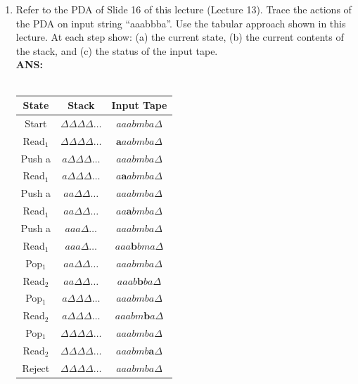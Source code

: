 \documentclass[letterpaper, 12 pt]{article}
\begin{document}
\begin{enumerate}
    \item[18.]Refer to the PDA of Slide 16 of this lecture (Lecture 13). Trace
        the actions of the PDA on input string “aaabbba”. Use the tabular
        approach shown in this lecture. At each step show: (a) the current
        state, (b) the current contents of the stack, and (c) the status of the
        input tape. \\
        \textbf{ANS:} \\ \hfill \\
        \begin{center}
            \begin{tabular}{| c | c | c |}
                \hline
                State & Stack & Input Tape \\ 
                \hline
                Start    & $\Delta \Delta \Delta \Delta \dots $ & $aaabmba             \Delta$ \\
                Read$_1$ & $\Delta \Delta \Delta \Delta \dots $ & $\bm{a}aabmba \Delta$ \\
                Push a   & $a \Delta \Delta \Delta      \dots $ & $aaabmba             \Delta$ \\
                Read$_1$ & $a \Delta \Delta \Delta      \dots $ & $a\bm{a}abmba \Delta$ \\
                Push a   & $a a \Delta \Delta           \dots $ & $aaabmba             \Delta$ \\
                Read$_1$ & $a a \Delta \Delta           \dots $ & $aa\bm{a}bmba \Delta$ \\
                Push a   & $a a a \Delta                \dots $ & $aaabmba             \Delta$ \\
                Read$_1$ & $a a a \Delta                \dots $ & $aaa\bm{b}bma \Delta$ \\
                Pop$_1$  & $a a \Delta \Delta           \dots $ & $aaabmba             \Delta$ \\
                Read$_2$ & $a a \Delta \Delta           \dots $ & $aaab\bm{b}ba \Delta$ \\
                Pop$_1$  & $a \Delta \Delta \Delta      \dots $ & $aaabmba             \Delta$ \\
                Read$_2$ & $a \Delta \Delta \Delta      \dots $ & $aaabm\bm{b}a \Delta$ \\
                Pop$_1$  & $\Delta \Delta \Delta \Delta \dots $ & $aaabmba             \Delta$ \\
                Read$_2$ & $\Delta \Delta \Delta \Delta \dots $ & $aaabmb\bm{a} \Delta$ \\
                Reject   & $\Delta \Delta \Delta \Delta \dots $ & $aaabmba             \Delta$ \\
                \hline
            \end{tabular}
        \end{center}


\end{enumerate}
\end{document}
